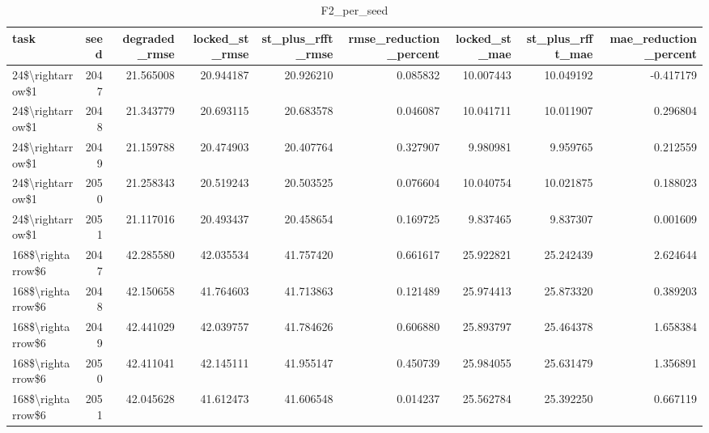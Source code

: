 \begin{table}
\caption{F2_per_seed}
\label{tab:F2_per_seed}
\begin{tabular}{lrrrrrrrr}
\toprule
task & seed & degraded\_rmse & locked\_st\_rmse & st\_plus\_rfft\_rmse & rmse\_reduction\_percent & locked\_st\_mae & st\_plus\_rfft\_mae & mae\_reduction\_percent \\
\midrule
24\$\textbackslash rightarrow\$1 & 2047 & 21.565008 & 20.944187 & 20.926210 & 0.085832 & 10.007443 & 10.049192 & -0.417179 \\
24\$\textbackslash rightarrow\$1 & 2048 & 21.343779 & 20.693115 & 20.683578 & 0.046087 & 10.041711 & 10.011907 & 0.296804 \\
24\$\textbackslash rightarrow\$1 & 2049 & 21.159788 & 20.474903 & 20.407764 & 0.327907 & 9.980981 & 9.959765 & 0.212559 \\
24\$\textbackslash rightarrow\$1 & 2050 & 21.258343 & 20.519243 & 20.503525 & 0.076604 & 10.040754 & 10.021875 & 0.188023 \\
24\$\textbackslash rightarrow\$1 & 2051 & 21.117016 & 20.493437 & 20.458654 & 0.169725 & 9.837465 & 9.837307 & 0.001609 \\
168\$\textbackslash rightarrow\$6 & 2047 & 42.285580 & 42.035534 & 41.757420 & 0.661617 & 25.922821 & 25.242439 & 2.624644 \\
168\$\textbackslash rightarrow\$6 & 2048 & 42.150658 & 41.764603 & 41.713863 & 0.121489 & 25.974413 & 25.873320 & 0.389203 \\
168\$\textbackslash rightarrow\$6 & 2049 & 42.441029 & 42.039757 & 41.784626 & 0.606880 & 25.893797 & 25.464378 & 1.658384 \\
168\$\textbackslash rightarrow\$6 & 2050 & 42.411041 & 42.145111 & 41.955147 & 0.450739 & 25.984055 & 25.631479 & 1.356891 \\
168\$\textbackslash rightarrow\$6 & 2051 & 42.045628 & 41.612473 & 41.606548 & 0.014237 & 25.562784 & 25.392250 & 0.667119 \\
\bottomrule
\end{tabular}
\end{table}
